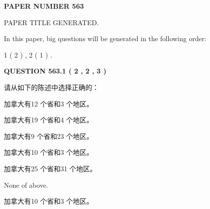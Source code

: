 \documentclass{ctexart}
\begin{document}
   
   
   
\newpage 
\setcounter{page}{ 
   563001 } 
   
   
   
   
 {\textbf{ \Large{ PAPER NUMBER  563  }}}
   
   
\vspace{0.2in}
   
   
   
   
   
   
   
   
 \vspace{0.2in}
 
 
 
 
   
   
 PAPER TITLE GENERATED.
   
   
   
\vspace{0.2in}
   
In this paper, big questions will be generated in the following order: 
   
   
   1 ( 2 )
 ,
   2 ( 1 )
 .
  
\vspace{0.2in}
  
{\textbf{\Large{QUESTION
563.1 
 ( 2 , 2 , 3 )
}}}
  
  
请从如下的陈述中选择正确的：
 
 
加拿大有12 个省和3 个地区。
 
 
加拿大有19 个省和4 个地区。
 
 
加拿大有9 个省和23 个地区。
 
 
加拿大有10 个省和3 个地区。
 
 
加拿大有25 个省和31 个地区。
 
 
 None of above.
 
 
\noindent{}
 
 
加拿大有10 个省和3 个地区。
 
 
\noindent{}
 
 
   
   
   
\end{document}
